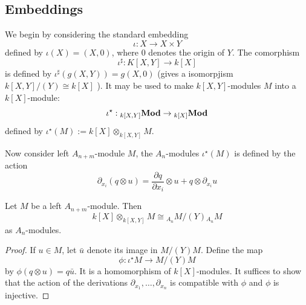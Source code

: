 \documentclass[12pt, oneside]{book}
\begin{document}
\subsection{Embeddings}



\begin{definition}
    We begin by considering the standard embedding \begin{equation*}
        \iota: X \rightarrow X \times Y
    \end{equation*}
    defined by $\iota(X)=(X, 0)$, where $0$ denotes the origin of $Y$.
    The comorphism
    \begin{equation*}
        \iota^{\sharp}: K[X, Y] \rightarrow k[X]
    \end{equation*}
    is defined by $\iota^{\sharp}(g(X, Y))=g(X, 0)$ (gives a isomorpjism $k[X,Y]/(Y) \cong k[X]$ ).
    It may be used to make $k[X, Y]$-modules $M$ into a $k[X]$-module:
    \begin{equation*}
        \iota^\star
        :{}_{k[X,Y]}\mathbf{Mod} \rightarrow {}_{k[X]}\mathbf{Mod}
    \end{equation*}
    defined by $\iota^\star \left(M\right):= k[X] \otimes_{k[X,Y]} M$.

    Now consider left $A_{n+m}$-module $M$, the $A_n$-modules $\iota^\star \left(M\right)$ is defined by the action
    \begin{equation*}
        \partial_{x_i}(q \otimes u)
        =
        \frac{\partial q}{\partial x_i} \otimes u+q \otimes \partial_{x_i} u
    \end{equation*}
\end{definition}

\begin{proposition}
    Let $M$ be a left $A_{n+m}$-module. Then
    \begin{equation*}
        k[X] \otimes_{k[X,Y]} M
        \cong
        {}_{A_n} M / \left(Y\right) {}_{A_n}M
    \end{equation*}
    as $A_n$-modules.
    \begin{proof}
        If $u \in M$, let $\bar{u}$ denote its image in $M /(Y) M$. Define the map
        \begin{equation*}
            \phi: \iota^{\star} M \rightarrow M /(Y) M
        \end{equation*}
        by $\phi(q \otimes u)=q \bar{u}$. It is a homomorphism of $k[X]$-modules.
        It suffices to show that the action of the derivations $\partial_{x_1}, \ldots, \partial_{x_n}$ is compatible with $\phi$ and $\phi$ is injective.
    \end{proof}
\end{proposition}
\end{document}
